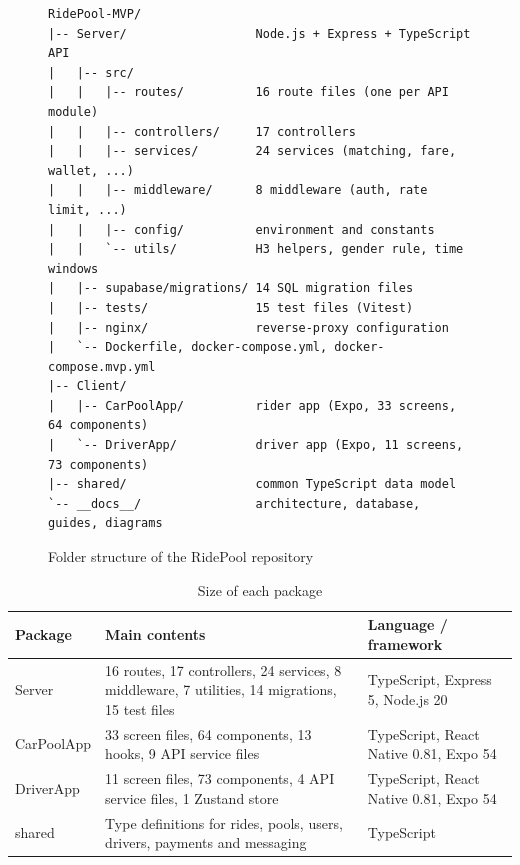 \begin{figure}[H]
\centering
\begin{minipage}{0.92\textwidth}
\small
\begin{verbatim}
RidePool-MVP/
|-- Server/                  Node.js + Express + TypeScript API
|   |-- src/
|   |   |-- routes/          16 route files (one per API module)
|   |   |-- controllers/     17 controllers
|   |   |-- services/        24 services (matching, fare, wallet, ...)
|   |   |-- middleware/      8 middleware (auth, rate limit, ...)
|   |   |-- config/          environment and constants
|   |   `-- utils/           H3 helpers, gender rule, time windows
|   |-- supabase/migrations/ 14 SQL migration files
|   |-- tests/               15 test files (Vitest)
|   |-- nginx/               reverse-proxy configuration
|   `-- Dockerfile, docker-compose.yml, docker-compose.mvp.yml
|-- Client/
|   |-- CarPoolApp/          rider app (Expo, 33 screens, 64 components)
|   `-- DriverApp/           driver app (Expo, 11 screens, 73 components)
|-- shared/                  common TypeScript data model
`-- __docs__/                architecture, database, guides, diagrams
\end{verbatim}
\end{minipage}
\caption{Folder structure of the RidePool repository}
\label{fig:structure}
\end{figure}

\begin{table}[H]
  \centering
  \small
  \caption{Size of each package}
  \label{tab:package-size}
  \begin{tabularx}{\textwidth}{@{}p{2.4cm}Lp{4.2cm}@{}}
    \toprule
    \textbf{Package} & \textbf{Main contents} & \textbf{Language / framework} \\
    \midrule
    Server     & 16 routes, 17 controllers, 24 services, 8 middleware, 7 utilities, 14 migrations, 15 test files & TypeScript, Express 5, Node.js 20 \\
    CarPoolApp & 33 screen files, 64 components, 13 hooks, 9 API service files & TypeScript, React Native 0.81, Expo 54 \\
    DriverApp  & 11 screen files, 73 components, 4 API service files, 1 Zustand store & TypeScript, React Native 0.81, Expo 54 \\
    shared     & Type definitions for rides, pools, users, drivers, payments and messaging & TypeScript \\
    \bottomrule
  \end{tabularx}
\end{table}

